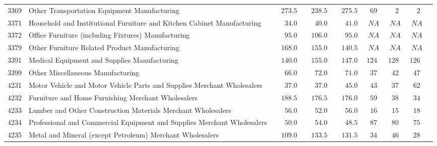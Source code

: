 \documentclass[9pt, oneside]{article}   	%
\begin{document}
\begin{longtable}{lp{3.5 in}ccccccc}
3369  & Other Transportation Equipment Manufacturing & $\phantom{00}273.5$ & $\phantom{00}238.5$ & $\phantom{00}275.5$ & $\phantom{0}69$ & $\phantom{00}2$ & $\phantom{00}2$ \\
3371  & Household and Institutional Furniture and Kitchen Cabinet Manufacturing & $\phantom{000}34.0$ & $\phantom{000}40.0$ & $\phantom{000}41.0$ & $\phantom{0}NA$ & $\phantom{0}NA$ & $\phantom{0}NA$ \\
3372  & Office Furniture (including Fixtures) Manufacturing & $\phantom{000}95.0$ & $\phantom{00}106.0$ & $\phantom{000}95.0$ & $\phantom{0}NA$ & $\phantom{0}NA$ & $\phantom{0}NA$ \\
3379  & Other Furniture Related Product Manufacturing & $\phantom{00}168.0$ & $\phantom{00}155.0$ & $\phantom{00}140.5$ & $\phantom{0}NA$ & $\phantom{0}NA$ & $\phantom{0}NA$ \\
3391  & Medical Equipment and Supplies Manufacturing & $\phantom{00}140.0$ & $\phantom{00}155.0$ & $\phantom{00}147.0$ & $124$ & $128$ & $126$ \\
3399  & Other Miscellaneous Manufacturing & $\phantom{000}66.0$ & $\phantom{000}72.0$ & $\phantom{000}71.0$ & $\phantom{0}37$ & $\phantom{0}42$ & $\phantom{0}47$ \\
4231  & Motor Vehicle and Motor Vehicle Parts and Supplies Merchant Wholesalers & $\phantom{000}37.0$ & $\phantom{000}37.0$ & $\phantom{000}45.0$ & $\phantom{0}43$ & $\phantom{0}37$ & $\phantom{0}62$ \\
4232  & Furniture and Home Furnishing Merchant Wholesalers & $\phantom{00}188.5$ & $\phantom{00}176.5$ & $\phantom{00}176.0$ & $\phantom{0}59$ & $\phantom{0}38$ & $\phantom{0}34$ \\
4233  & Lumber and Other Construction Materials Merchant Wholesalers & $\phantom{000}56.0$ & $\phantom{000}52.0$ & $\phantom{000}56.0$ & $\phantom{0}16$ & $\phantom{0}15$ & $\phantom{0}18$ \\
4234  & Professional and Commercial Equipment and Supplies Merchant Wholesalers & $\phantom{000}50.0$ & $\phantom{000}54.0$ & $\phantom{000}48.5$ & $\phantom{0}87$ & $\phantom{0}80$ & $\phantom{0}75$ \\
4235  & Metal and Mineral (except Petroleum) Merchant Wholesalers & $\phantom{00}109.0$ & $\phantom{00}133.5$ & $\phantom{00}131.5$ & $\phantom{0}34$ & $\phantom{0}46$ & $\phantom{0}28$ \\

\end{longtable}
\end{document}
